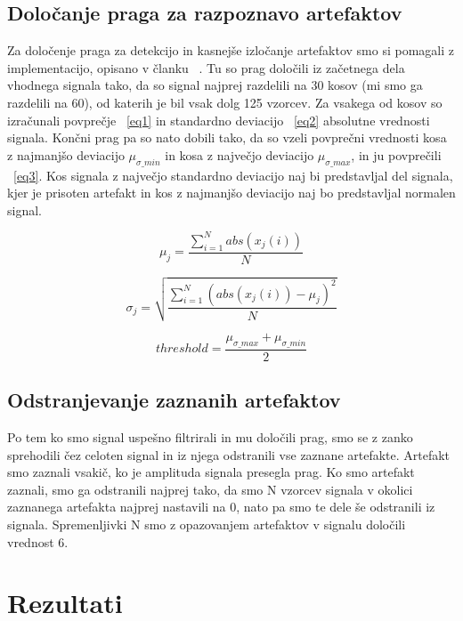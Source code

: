 \documentclass[9pt]{IEEEtran}
\begin{document}
\subsection{Določanje praga za razpoznavo artefaktov}

Za določenje praga za detekcijo in kasnejše izločanje artefaktov smo si pomagali z implementacijo, opisano v članku ~\cite{gupta1996preprocessing}. Tu so prag določili iz začetnega dela vhodnega signala tako, da so signal najprej  razdelili na 30 kosov (mi smo ga razdelili na 60), od katerih je bil vsak dolg 125 vzorcev.  Za vsakega od kosov so izračunali povprečje ~\ref{eq1} in standardno deviacijo ~\ref{eq2} absolutne vrednosti signala. Končni prag pa so nato dobili tako, da so vzeli povprečni vrednosti kosa z najmanjšo deviacijo $\mu_{\sigma\_min}$ in kosa z največjo deviacijo $\mu_{\sigma\_max}$, in ju povprečili ~\ref{eq3}. Kos signala z največjo standardno deviacijo naj bi predstavljal del signala, kjer je prisoten artefakt in kos z najmanjšo deviacijo naj bo predstavljal normalen signal. 

\begin{equation} \label{eq1}
\mu_j = \dfrac{\sum_{i=1}^{N} abs(x_j(i))}{N}
\end{equation}

\begin{equation} \label{eq2}
\sigma_j = \sqrt{\dfrac{\sum_{i=1}^{N} (abs(x_j(i)) - \mu_j)^2}{N}}
\end{equation}

\begin{equation} \label{eq3}
threshold = \dfrac{\mu_{\sigma\_max} + \mu_{\sigma\_min}}{2}
\end{equation}

\subsection{Odstranjevanje zaznanih artefaktov} 
 
Po tem ko smo signal uspešno filtrirali in mu določili prag, smo se z zanko sprehodili čez celoten signal in iz njega odstranili vse zaznane artefakte. Artefakt smo zaznali vsakič, ko je amplituda signala presegla prag. Ko smo artefakt zaznali, smo ga odstranili najprej tako, da smo N vzorcev signala v okolici zaznanega artefakta najprej nastavili na 0, nato pa smo te dele še odstranili iz signala. Spremenljivki N smo z opazovanjem artefaktov v signalu določili vrednost 6.

\section{Rezultati}
\end{document}
